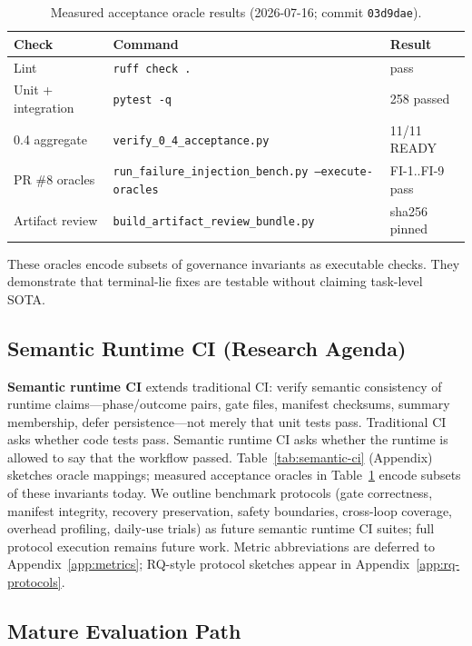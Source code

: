 \documentclass[11pt]{article}
\begin{document}
\begin{table}[t]
  \centering
  \caption{Measured acceptance oracle results (2026-07-16; commit \texttt{03d9dae}).}
  \label{tab:acceptance-measured}
  \small
  \begin{tabular}{@{}lll@{}}
    \toprule
    \textbf{Check} & \textbf{Command} & \textbf{Result} \\
    \midrule
    Lint & \texttt{ruff check .} & pass \\
    Unit + integration & \texttt{pytest -q} & 258 passed \\
    0.4 aggregate & \texttt{verify\_0\_4\_acceptance.py} & 11/11 READY \\
    PR \#8 oracles & \texttt{run\_failure\_injection\_bench.py --execute-oracles} & FI-1..FI-9 pass \\
    Artifact review & \texttt{build\_artifact\_review\_bundle.py} & sha256 pinned \\
    \bottomrule
  \end{tabular}
\end{table}

These oracles encode subsets of governance invariants as executable checks.
They demonstrate that terminal-lie fixes are testable without claiming task-level SOTA.

\subsection{Semantic Runtime CI (Research Agenda)}
\textbf{Semantic runtime CI} extends traditional CI: verify semantic consistency of runtime claims---phase/outcome pairs, gate files, manifest checksums, summary membership, defer persistence---not merely that unit tests pass.
Traditional CI asks whether code tests pass.
Semantic runtime CI asks whether the runtime is allowed to say that the workflow passed.
Table~\ref{tab:semantic-ci} (Appendix) sketches oracle mappings; measured acceptance oracles in Table~\ref{tab:acceptance-measured} encode subsets of these invariants today.
We outline benchmark protocols (gate correctness, manifest integrity, recovery preservation, safety boundaries, cross-loop coverage, overhead profiling, daily-use trials) as future semantic runtime CI suites; full protocol execution remains future work.
Metric abbreviations are deferred to Appendix~\ref{app:metrics}; RQ-style protocol sketches appear in Appendix~\ref{app:rq-protocols}.

\subsection{Mature Evaluation Path}
\label{sec:mature-eval}
\end{document}
